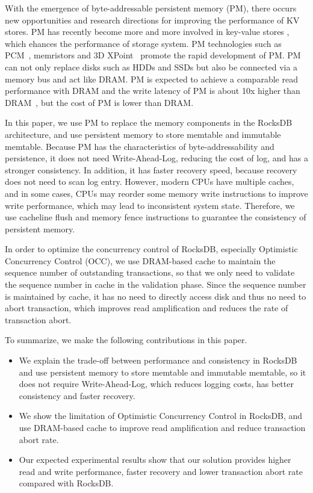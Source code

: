 With the emergence of byte-addressable persistent memory (PM), there occurs new opportunities and research directions for improving the performance of KV stores. PM has recently become more and more involved in key-value stores \cite{NVMRocks,DBLP:conf/usenix/KannanBGAA18,DBLP:conf/usenix/XiaJXS17}, which ehances the performance of storage system. PM technologies such as PCM~\cite{PCM}, memristors and 3D XPoint~\cite{3DXPoint} promote the rapid development of PM. PM can not only replace disks such as HDDs and SSDs but also be connected via a memory bus and act like DRAM. PM is expected to achieve a comparable read performance with DRAM and the write latency of PM is about 10x higher than DRAM~\cite{DBLP:conf/usenix/XiaJXS17}, but the cost of PM is lower than DRAM. 

In this paper, we use PM to replace the memory components in the RocksDB architecture, and use persistent memory to store memtable and immutable memtable. Because PM has the characteristics of byte-addressability and persistence, it does not need Write-Ahead-Log, reducing the cost of log, and has a stronger consistency. In addition, it has faster recovery speed, because recovery does not need to scan log entry. However, modern CPUs have multiple caches, and in some cases, CPUs may reorder some memory write instructions to improve write performance, which may lead to inconsistent system state. Therefore, we use cacheline flush and memory fence instructions to guarantee the consistency of persistent memory.

In order to optimize the concurrency control of RocksDB, especially Optimistic Concurrency Control (OCC), we use DRAM-based cache to maintain the sequence number of outstanding transactions, so that we only need to validate the sequence number in cache in the validation phase. Since the sequence number is maintained by cache, it has no need to directly access disk and thus no need to abort transaction, which improves read amplification and reduces the rate of transaction abort.

To summarize, we make the following contributions in this paper.
\begin{itemize}
\item We explain the trade-off between performance and consistency in RocksDB and use persistent memory to store memtable and immutable memtable, so it does not require Write-Ahead-Log, which reduces logging costs, has better consistency and faster recovery.
\item We show the limitation of Optimistic Concurrency Control in RocksDB, and use DRAM-based cache to improve read amplification and reduce transaction abort rate.
\item Our expected experimental results show that our solution provides higher read and write performance, faster recovery and lower transaction abort rate compared with RocksDB.
\end{itemize}

